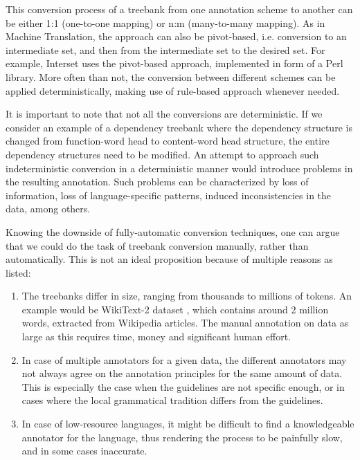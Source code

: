 This conversion process of a treebank from one annotation scheme to another can be either 1:1 (one-to-one mapping) or n:m (many-to-many mapping). As in Machine Translation, the approach can also be pivot-based, i.e. conversion to an intermediate set, and then from the intermediate set to the desired set. For example, Interset \citep{interset}  uses the pivot-based approach, implemented in form of a Perl library. More often than not, the conversion between different schemes can be applied deterministically, making use of rule-based approach whenever needed.

It is important to note that not all the conversions are deterministic. If we consider an example of a dependency treebank where the dependency structure is changed from function-word head to content-word head structure, the entire dependency structures need to be modified. An attempt to approach such indeterministic conversion in a deterministic manner would introduce problems in the resulting annotation. Such problems can be characterized by loss of information, loss of language-specific patterns, induced inconsistencies in the data, among others.

Knowing the downside of fully-automatic conversion techniques, one can argue that we could do the task of treebank conversion manually, rather than automatically. This is not an ideal proposition because of multiple reasons as listed:
\begin{enumerate}
    \item The treebanks differ in size, ranging from thousands to millions of tokens. An example would be WikiText-2 dataset \citep{Wikitext2}, which contains around 2 million words, extracted from Wikipedia articles. The manual annotation on data as large as this requires time, money and significant human effort.
    \item In case of multiple annotators for a given data, the different annotators may not always agree on the annotation principles for the same amount of data. This is especially the case when the guidelines are not specific enough, or in cases where the local grammatical tradition differs from the guidelines.
    \item In case of low-resource languages, it might be difficult to find a knowledgeable annotator for the language, thus rendering the process to be painfully slow, and in some cases inaccurate.
\end{enumerate}

